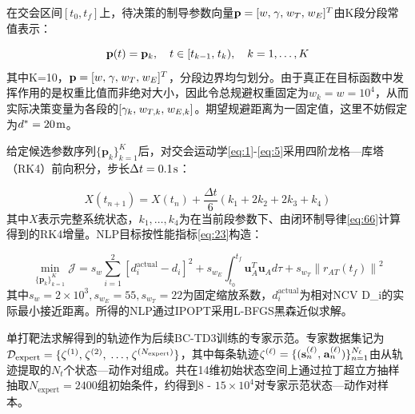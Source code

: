 在交会区间$[{t_0},{t_f}]$上，待决策的制导参数向量${\mathbf{p}} = {[w,{\kern 1pt} \gamma ,{\kern 1pt} {w_T},{\kern 1pt} {w_E}]^T}$由K段分段常值表示：

\begin{equation}
\label{eq:69}
{\mathbf{p}}(t) = {{\mathbf{p}}_k},\quad t \in [{t_{k - 1}},{\kern 1pt} {t_k}),\quad k = 1, \ldots ,K
\end{equation}
其中K=10，${\mathbf{p}} = {[w,{\kern 1pt} \gamma ,{\kern 1pt} {w_T},{\kern 1pt} {w_E}]^T}$，分段边界均匀划分。由于真正在目标函数中发挥作用的是权重比值而非绝对大小，因此令总规避权重固定为${w_k} = w = {10^4}$，从而实际决策变量为各段的$[{\gamma _k},{\kern 1pt} {w_{T,k}},{\kern 1pt} {w_{E,k}}]$。期望规避距离为一固定值，这里不妨假定为${d^*} = 20{\kern 1pt} {\text{m}}$。

给定候选参数序列$\{ {{\mathbf{p}}_k}\} _{k = 1}^K$后，对交会运动学\eqref{eq:1}-\eqref{eq:5}采用四阶龙格—库塔（RK4）前向积分，步长$\Delta t = 0.1{\kern 1pt} {\text{s}}$：

\begin{equation}
\label{eq:70}
X({t_{n + 1}}) = X({t_n}) + \frac{{\Delta t}}{6}({k_1} + 2{k_2} + 2{k_3} + {k_4})
\end{equation}
其中$X$表示完整系统状态，${k_1}, \ldots ,{k_4}$为在当前段参数下、由闭环制导律\eqref{eq:66}计算得到的RK4增量。NLP目标按性能指标\eqref{eq:23}构造：

\begin{equation}
\label{eq:71}
\mathop {\min }\limits_{\{ {{\mathbf{p}}_k}\} _{k = 1}^K} \mathcal{J} = {s_w}\sum\limits_{i = 1}^2 {{{\left[ {d_i^{{\text{actual}}} - {d_i}} \right]}^2}}  + {s_{{w_E}}}\int_{{t_0}}^{{t_f}} {{\mathbf{u}}_A^T{{\mathbf{u}}_A}d\tau }  + {s_{{w_T}}}{\left\| {{r_{AT}}({t_f})} \right\|^2}
\end{equation}
其中${s_w} = 2 \times {10^3},{s_{{w_E}}} = 55,{s_{{w_T}}} = 22$为固定缩放系数，$d_i^{{\text{actual}}}$为相对NCV D\_i的实际最小接近距离。所得的NLP通过IPOPT采用L-BFGS黑森近似求解。

单打靶法求解得到的轨迹作为后续BC-TD3训练的专家示范。专家数据集记为${\mathcal{D}_{{\text{expert}}}} = \{ {\zeta ^{(1)}},{\kern 1pt} {\zeta ^{(2)}},{\kern 1pt}  \ldots ,{\kern 1pt} {\zeta ^{({N_{{\text{expert}}}})}}\} $，其中每条轨迹${\zeta ^{(\ell )}} = \{ ({\mathbf{s}}_n^{(\ell )},{\kern 1pt} {\mathbf{a}}_n^{(\ell )})\} _{n = 1}^{{N_\ell }}$由从轨迹提取的${N_t}$个状态—动作对组成。共在14维初始状态空间上通过拉丁超立方抽样抽取${N_{{\text{expert}}}} = 2400$组初始条件，约得到$8{\text{ - }}15 \times {10^4}$对专家示范状态—动作对样本。

